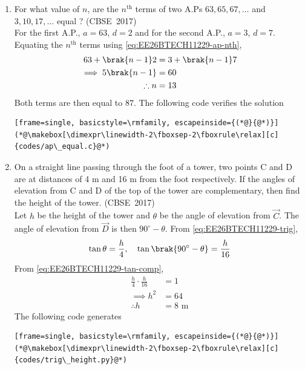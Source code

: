 \begin{enumerate}[label=\thesubsection.\arabic*, ref=\thesubsection.\theenumi]
The following code verifies the solution
\begin{lstlisting}[frame=single, basicstyle=\rmfamily, escapeinside={(*@}{@*)}]
(*@\makebox[\dimexpr\linewidth-2\fboxsep-2\fboxrule\relax][c]{codes/quadratic.c}@*)
\end{lstlisting}
\item 
For what value of $n$, are the $n^{\text{th}}$ terms of two A.Ps $63, 65, 67, \ldots$ and $3, 10, 17, \ldots$ equal ?
\hfill (CBSE~2017)
\\
\solution
For the first A.P., $a = 63$, $d = 2$ and for the second A.P., $a = 3$, $d = 7$. Equating the $n^{\text{th}}$ terms using \eqref{eq:EE26BTECH11229-ap-nth},
\begin{align}
	63 + \brak{n-1}2 &= 3 + \brak{n-1}7
	\\
	\implies 5\brak{n-1} &= 60
	\\
	\therefore n &= 13
\end{align}
Both terms are then equal to $87$.
The following code verifies the solution
\begin{lstlisting}[frame=single, basicstyle=\rmfamily, escapeinside={(*@}{@*)}]
(*@\makebox[\dimexpr\linewidth-2\fboxsep-2\fboxrule\relax][c]{codes/ap\_equal.c}@*)
\end{lstlisting}
\item 
On a straight line passing through the foot of a tower, two points C and D are at distances of 4 m and 16 m from the foot respectively. If the angles of elevation from C and D of the top of the tower are complementary, then find the height of the tower.
\hfill (CBSE~2017)
\\
\solution
Let $h$ be the height of the tower and $\theta$ be the angle of elevation from $\vec{C}$. The angle of elevation from $\vec{D}$ is then $90^{\circ} - \theta$. From \eqref{eq:EE26BTECH11229-trig},
\begin{align}
	\tan\theta = \frac{h}{4}, \quad \tan\brak{90^{\circ}-\theta} = \frac{h}{16}
\end{align}
From \eqref{eq:EE26BTECH11229-tan-comp},
\begin{align}
	\frac{h}{4}\cdot\frac{h}{16} &= 1
	\\
	\implies h^2 &= 64
	\\
	\therefore h &= 8 \text{ m}
\end{align}
The following code generates 
\begin{lstlisting}[frame=single, basicstyle=\rmfamily, escapeinside={(*@}{@*)}]
(*@\makebox[\dimexpr\linewidth-2\fboxsep-2\fboxrule\relax][c]{codes/trig\_height.py}@*)

\end{lstlisting}
\end{enumerate}
